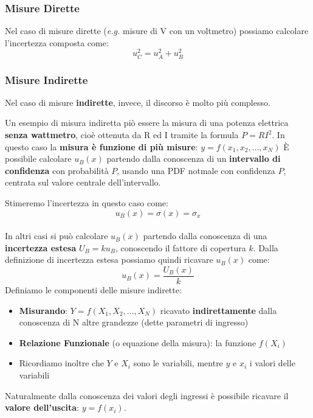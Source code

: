 \documentclass[a4paper,11pt]{report}
\begin{document}
\subsubsection{Misure Dirette}
Nel caso di misure dirette (\textit{e.g.} misure di V con un voltmetro) possiamo calcolare l'incertezza composta come:
$$
  u^2_C = u^2_A + u^2_B
$$
\subsubsection{Misure Indirette}
Nel caso di misure \textbf{indirette}, invece, il discorso è molto più complesso.

Un esempio di misura indiretta piò essere la misura di una potenza elettrica \textbf{senza wattmetro}, cioè ottenuta da R ed I tramite la formula $P = RI^2$. In questo caso la \textbf{misura è funzione di più misure}: $y = f(x_1,x_2,\ldots ,x_N)$
È possibile calcolare $u_B(x)$ partendo dalla conoscenza di un \textbf{ intervallo di confidenza} con probabilità $P$, usando una PDF notmale con confidenza $P$, centrata sul valore centrale dell'intervallo.

Stimeremo l'incertezza in questo caso come:
$$
  u_B(x) = \sigma(x) = \sigma_x
$$\\

In altri casi si può calcolare $u_B(x)$ partendo dalla conoscenza di una \textbf{incertezza estesa} $U_B = k u_B$, conoscendo il fattore di copertura $k$. Dalla definizione di incertezza estesa possiamo quindi ricavare $u_B(x)$ come:
$$
  u_B(x) = \frac{U_B(x)}{k}
$$
Definiamo le componenti delle misure indirette:
\begin{itemize}
  \item \textbf{Misurando}: $Y = f(X_1,X_2,\ldots,X_N)$ ricavato \textbf{indirettamente} dalla conoscenza di N altre grandezze (dette parametri di ingresso)
  \item \textbf{Relazione Funzionale} (o equazione della misura): la funzione $f(X_i)$
  \item Ricordiamo inoltre che $Y$ e $X_i$ sono le variabili, mentre $y$ e $x_i$ i valori delle variabili
\end{itemize}
Naturalmente dalla conoscenza dei valori degli ingressi è possibile ricavare il \textbf{valore dell'uscita}: $y = f(x_i)$.
\end{document}

